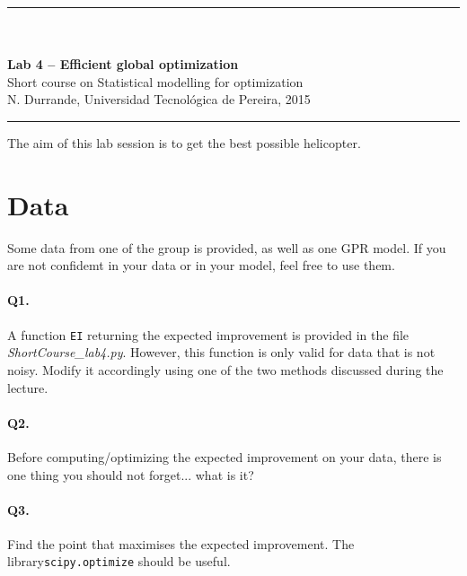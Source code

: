 \documentclass[12pt]{scrartcl}
\begin{document}
\begin{center}
	\rule{\textwidth}{1pt}
	\\ \ \\
	{\LARGE \textbf{Lab 4 -- Efficient global optimization}}\\ 
	\vspace{3mm}
	{\large Short course on Statistical modelling for optimization\\ \vspace{3mm}}
	{\normalsize N. Durrande, Universidad Tecnol\'ogica de Pereira, 2015}\\ 
	\vspace{3mm}
	\rule{\textwidth}{1pt}
	\vspace{5mm}
\end{center}
The aim of this lab session is to get the best possible helicopter.

\section{Data}
Some data from one of the group is provided, as well as one GPR model. If you are not confidemt in your data or in your model, feel free to use them. 

\paragraph{Q1.} A function \texttt{EI} returning the expected improvement is provided in the file \emph{ShortCourse\_lab4.py}. However, this function is only valid for data that is not noisy. Modify it accordingly using one of the two methods discussed during the lecture.

\paragraph{Q2.} Before computing/optimizing the expected improvement on your data, there is one thing you should not forget... what is it?

\paragraph{Q3.} Find the point that maximises the expected improvement. The library\linebreak \texttt{scipy.optimize} should be useful.
\end{document}
